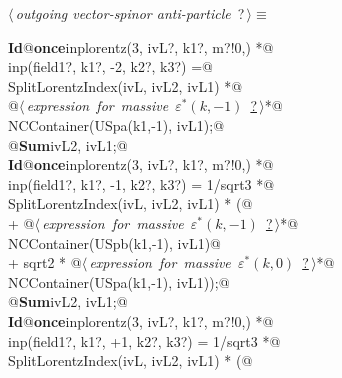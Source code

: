 \documentclass[a4paper,12pt]{amsart}
\renewcommand{\NWtarget}[2]{\hypertarget{#1}{#2}}
\renewcommand{\NWlink}[2]{\hyperlink{#1}{#2}}
\begin{document}
\begin{flushleft} \small
\begin{minipage}{\linewidth}\label{scrap36}\raggedright\small
\NWtarget{nuweb?}{} $\langle\,${\it outgoing vector-spinor anti-particle}\nobreak\ {\footnotesize {?}}$\,\rangle\equiv$
\vspace{-1ex}
\begin{list}{}{} \item
\mbox{}\verb@@\hbox{\sffamily\bfseries Id}\verb@ @\hbox{\sffamily\bfseries once}\verb@ inplorentz(3, ivL?, k1?, m?!{0,}) *@\\
\mbox{}\verb@      inp(field1?, k1?, -2, k2?, k3?) =@\\
\mbox{}\verb@   SplitLorentzIndex(ivL, ivL2, ivL1) *@\\
\mbox{}\verb@   @\hbox{$\langle\,${\it expression for massive $\varepsilon^\ast(k, -1)$}\nobreak\ {\footnotesize \NWlink{nuweb?}{?}}$\,\rangle$}\verb@ *@\\
\mbox{}\verb@   NCContainer(USpa(k1,-1), ivL1);@\\
\mbox{}\verb@   @\hbox{\sffamily\bfseries Sum}\verb@ ivL2, ivL1;@\\
\mbox{}\verb@@\hbox{\sffamily\bfseries Id}\verb@ @\hbox{\sffamily\bfseries once}\verb@ inplorentz(3, ivL?, k1?, m?!{0,}) *@\\
\mbox{}\verb@      inp(field1?, k1?, -1, k2?, k3?) = 1/sqrt3 *@\\
\mbox{}\verb@   SplitLorentzIndex(ivL, ivL2, ivL1) * (@\\
\mbox{}\verb@   + @\hbox{$\langle\,${\it expression for massive $\varepsilon^\ast(k, -1)$}\nobreak\ {\footnotesize \NWlink{nuweb?}{?}}$\,\rangle$}\verb@ *@\\
\mbox{}\verb@     NCContainer(USpb(k1,-1), ivL1)@\\
\mbox{}\verb@   + sqrt2 * @\hbox{$\langle\,${\it expression for massive $\varepsilon^\ast(k, 0)$}\nobreak\ {\footnotesize \NWlink{nuweb?}{?}}$\,\rangle$}\verb@ *@\\
\mbox{}\verb@     NCContainer(USpa(k1,-1), ivL1));@\\
\mbox{}\verb@   @\hbox{\sffamily\bfseries Sum}\verb@ ivL2, ivL1;@\\
\mbox{}\verb@@\hbox{\sffamily\bfseries Id}\verb@ @\hbox{\sffamily\bfseries once}\verb@ inplorentz(3, ivL?, k1?, m?!{0,}) *@\\
\mbox{}\verb@      inp(field1?, k1?, +1, k2?, k3?) = 1/sqrt3 *@\\
\mbox{}\verb@   SplitLorentzIndex(ivL, ivL2, ivL1) * (@\\

\end{list}
\end{minipage}
\end{flushleft}
\end{document}
